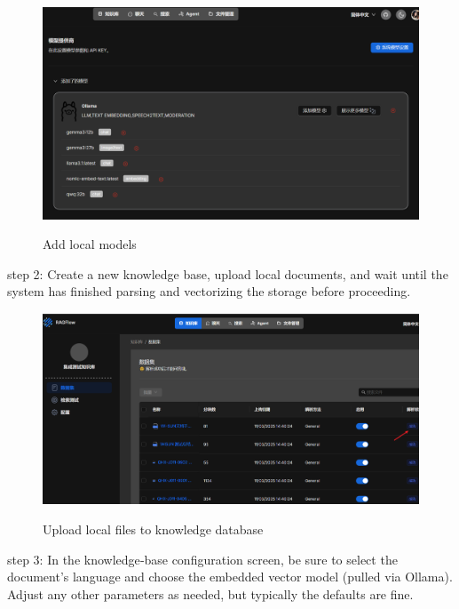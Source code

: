 \begin{figure}[H]
    \begin{center}
        \includegraphics[width=.95\linewidth]{res/ragflow-addmodel.png}\\
        \caption{Add local models }\label{ragflow-addmodel}
    \end{center}
\end{figure}

step 2: Create a new knowledge base, upload local documents, and wait until the system has finished parsing and vectorizing the storage before proceeding.

\begin{figure}[H]
    \begin{center}
        \includegraphics[width=.95\linewidth]{res/ragflow-upload.png}\\
        \caption{Upload local files to knowledge database }\label{ragflow-upload}
    \end{center}
\end{figure}

step 3: In the knowledge‑base configuration screen, be sure to select the document’s language and choose the embedded vector model (pulled via Ollama). Adjust any other parameters as needed, but typically the defaults are fine.

